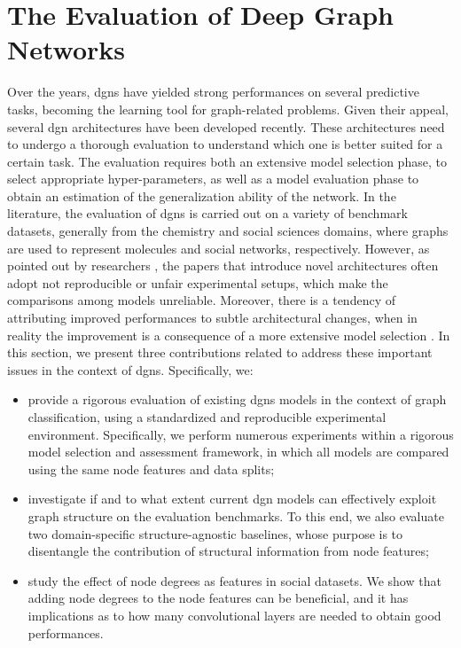\chapter{The Evaluation of Deep Graph Networks} \label{ch:evaluation-dgns}
Over the years, \glspl{dgn} have yielded strong performances on several predictive tasks, becoming the  learning tool for graph-related problems. Given their appeal, several \gls{dgn} architectures have been developed recently. These architectures need to undergo a thorough evaluation to understand which one is better suited for a certain task. The evaluation requires both an extensive model selection phase, to select appropriate hyper-parameters, as well as a model evaluation phase to obtain an estimation of the generalization ability of the network. In the literature, the evaluation of \glspl{dgn} is carried out on a variety of benchmark datasets, generally from the chemistry and social sciences domains, where graphs are used to represent molecules and social networks, respectively. However, as pointed out by researchers \citep{shchur2018pitfalls}, the papers that introduce novel architectures often adopt not reproducible or unfair experimental setups, which make the comparisons among models unreliable. Moreover, there is a tendency of attributing improved performances to subtle architectural changes, when in reality the improvement is a consequence of a more extensive model selection \cite{lipton2018troubling}. In this section, we present three contributions related to address these important issues in the context of \glspl{dgn}. Specifically, we:
\begin{itemize}
    \item provide a rigorous evaluation of existing \glspl{dgn} models in the context of graph classification, using a standardized and reproducible experimental environment. Specifically, we perform numerous experiments within a rigorous model selection and assessment framework, in which all models are compared using the same node features and data splits;
    \item investigate if and to what extent current \gls{dgn} models can effectively exploit graph structure on the evaluation benchmarks. To this end, we also evaluate two domain-specific structure-agnostic baselines, whose purpose is to disentangle the contribution of structural information from node features;
    \item study the effect of node degrees as features in social datasets. We show that adding node degrees to the node features can be beneficial, and it has implications as to how many convolutional layers are needed to obtain good performances.
\end{itemize}

